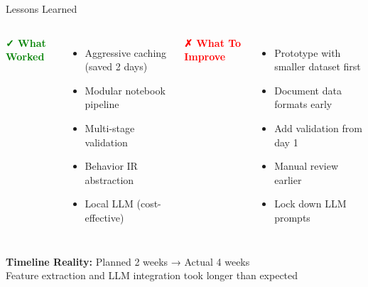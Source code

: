 \documentclass[11pt,aspectratio=16:9]{beamer}
\begin{document}
\begin{frame}{Lessons Learned}
  \vspace{0.5cm}
  \begin{columns}
    {\Large \textbf{\textcolor{green}{✓ What Worked}}}\\[0.4cm]
    {\small
    \begin{itemize}
      \item Aggressive caching (saved 2 days)
      \item Modular notebook pipeline
      \item Multi-stage validation
      \item Behavior IR abstraction
      \item Local LLM (cost-effective)
    \end{itemize}
    }
    
    {\Large \textbf{\textcolor{red}{✗ What To Improve}}}\\[0.4cm]
    {\small
    \begin{itemize}
      \item Prototype with smaller dataset first
      \item Document data formats early
      \item Add validation from day 1
      \item Manual review earlier
      \item Lock down LLM prompts
    \end{itemize}
    }
  \end{columns}
  
  \vspace{0.8cm}
  \begin{tcolorbox}[colback=orange!10, colframe=orange, boxrule=2pt]
    \centering \textbf{Timeline Reality:} Planned 2 weeks → Actual 4 weeks\\
    {\small Feature extraction and LLM integration took longer than expected}
  \end{tcolorbox}
\end{frame}
\end{document}
